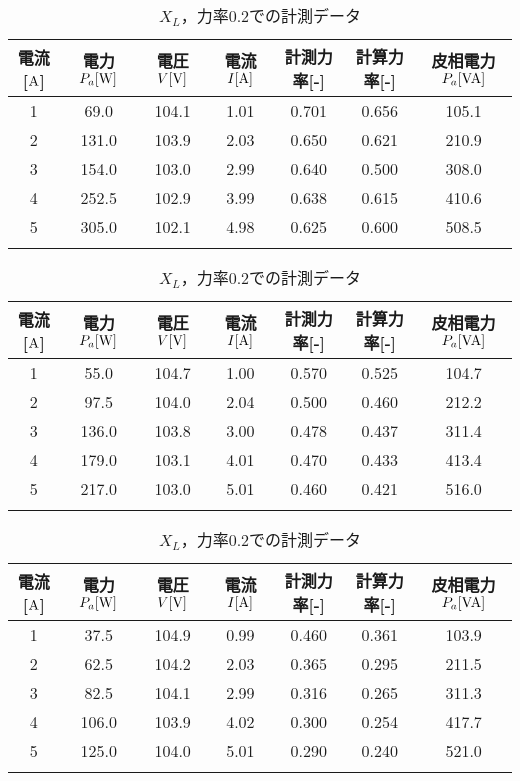 \begin{itemize}
\begin{table}[h]
\begin{tabular}{ccccccc}
	\hline
	電流[$\rm{A}$] & 電力$P_a[\rm{W}]$ & 電圧$V[\rm{V}]$ & 電流$I[\rm{A}]$ & 計測力率[-] & 計算力率[-] & 皮相電力$P_a[\rm{VA}]$ \\ \hline
	1 & 69.0  & 104.1 & 1.01 & 0.701 & 0.656 & 105.1 \\
	2 & 131.0 & 103.9 & 2.03 & 0.650 & 0.621 & 210.9 \\
	3 & 154.0 & 103.0 & 2.99 & 0.640 & 0.500 & 308.0 \\
	4 & 252.5 & 102.9 & 3.99 & 0.638 & 0.615 & 410.6 \\
	5 & 305.0 & 102.1 & 4.98 & 0.625 & 0.600 & 508.5 \\ \hline\\
\end{tabular}
	\caption{$X_{L}$，力率$0.4$での計測データ}
	\label{tab:0.4data}
\begin{tabular}{ccccccc}
	\hline
	電流[$\rm{A}$] & 電力$P_a[\rm{W}]$ & 電圧$V[\rm{V}]$ & 電流$I[\rm{A}]$ & 計測力率[-] & 計算力率[-] & 皮相電力$P_a[\rm{VA}]$ \\ \hline
	1 & 55.0  & 104.7 & 1.00 & 0.570 & 0.525 & 104.7 \\
	2 & 97.5  & 104.0 & 2.04 & 0.500 & 0.460 & 212.2 \\
	3 & 136.0 & 103.8 & 3.00 & 0.478 & 0.437 & 311.4 \\
	4 & 179.0 & 103.1 & 4.01 & 0.470 & 0.433 & 413.4 \\
	5 & 217.0 & 103.0 & 5.01 & 0.460 & 0.421 & 516.0 \\ \hline\\
\end{tabular}
	\caption{$X_{L}$，力率$0.2$での計測データ}
	\label{tab:0.2data}
\begin{tabular}{ccccccc}
	\hline
	電流[$\rm{A}$] & 電力$P_a[\rm{W}]$ & 電圧$V[\rm{V}]$ & 電流$I[\rm{A}]$ & 計測力率[-] & 計算力率[-] & 皮相電力$P_a[\rm{VA}]$ \\ \hline
	1 & 37.5  & 104.9 & 0.99 & 0.460 & 0.361 & 103.9 \\
	2 & 62.5  & 104.2 & 2.03 & 0.365 & 0.295 & 211.5 \\
	3 & 82.5  & 104.1 & 2.99 & 0.316 & 0.265 & 311.3 \\
	4 & 106.0 & 103.9 & 4.02 & 0.300 & 0.254 & 417.7 \\
	5 & 125.0 & 104.0 & 5.01 & 0.290 & 0.240 & 521.0 \\ \hline\\
\end{tabular}
\end{table}
\begin{table}[h]

\end{table}
\end{itemize}
